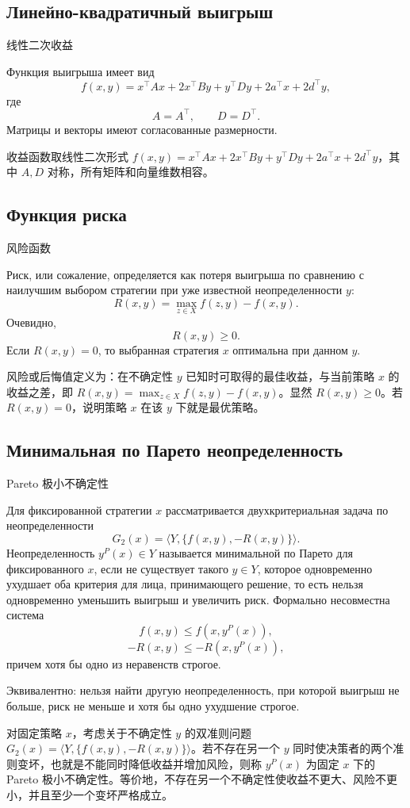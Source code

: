 \documentclass[12pt,a4paper]{article}
\newcommand{\zh}[1]{\par\noindent #1\par}
\begin{document}

\subsection*{Линейно-квадратичный выигрыш}
\zh{线性二次收益}
Функция выигрыша имеет вид
\[
f(x,y)=x^{\top}Ax+2x^{\top}By+y^{\top}Dy+2a^{\top}x+2d^{\top}y,
\]
где
\[
A=A^{\top},
\qquad
D=D^{\top}.
\]
Матрицы и векторы имеют согласованные размерности.
\zh{收益函数取线性二次形式 \(f(x,y)=x^\top Ax+2x^\top By+y^\top Dy+2a^\top x+2d^\top y\)，其中 \(A,D\) 对称，所有矩阵和向量维数相容。}

\subsection*{Функция риска}
\zh{风险函数}
Риск, или сожаление, определяется как потеря выигрыша по сравнению с наилучшим выбором стратегии при уже известной неопределенности \(y\):
\[
R(x,y)=\max_{z\in X}f(z,y)-f(x,y).
\]
Очевидно,
\[
R(x,y)\ge 0.
\]
Если \(R(x,y)=0\), то выбранная стратегия \(x\) оптимальна при данном \(y\).
\zh{风险或后悔值定义为：在不确定性 \(y\) 已知时可取得的最佳收益，与当前策略 \(x\) 的收益之差，即 \(R(x,y)=\max_{z\in X}f(z,y)-f(x,y)\)。显然 \(R(x,y)\ge0\)。若 \(R(x,y)=0\)，说明策略 \(x\) 在该 \(y\) 下就是最优策略。}

\subsection*{Минимальная по Парето неопределенность}
\zh{Pareto 极小不确定性}
Для фиксированной стратегии \(x\) рассматривается двухкритериальная задача по неопределенности
\[
G_2(x)=\langle Y,\{f(x,y),-R(x,y)\}\rangle.
\]
Неопределенность \(y^P(x)\in Y\) называется минимальной по Парето для фиксированного \(x\), если не существует такого \(y\in Y\), которое одновременно ухудшает оба критерия для лица, принимающего решение, то есть нельзя одновременно уменьшить выигрыш и увеличить риск. Формально несовместна система
\[
f(x,y)\le f(x,y^P(x)),
\]
\[
-R(x,y)\le -R(x,y^P(x)),
\]
причем хотя бы одно из неравенств строгое.

Эквивалентно: нельзя найти другую неопределенность, при которой выигрыш не больше, риск не меньше и хотя бы одно ухудшение строгое.
\zh{对固定策略 \(x\)，考虑关于不确定性 \(y\) 的双准则问题 \(G_2(x)=\langle Y,\{f(x,y),-R(x,y)\}\rangle\)。若不存在另一个 \(y\) 同时使决策者的两个准则变坏，也就是不能同时降低收益并增加风险，则称 \(y^P(x)\) 为固定 \(x\) 下的 Pareto 极小不确定性。等价地，不存在另一个不确定性使收益不更大、风险不更小，并且至少一个变坏严格成立。}
\end{document}
